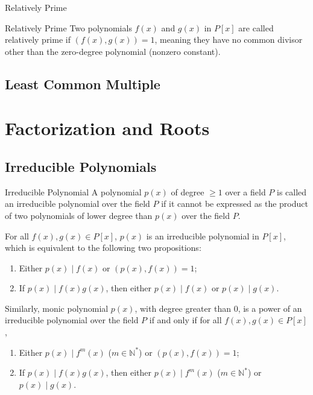 \documentclass[11pt]{elegantbook}
\begin{document}
\begin{leftbarTitle}{Relatively Prime}\end{leftbarTitle}

\begin{definition}{Relatively Prime}
    Two polynomials \( f(x) \) and \( g(x) \) in \( P[x] \) are called relatively prime 
    if \( (f(x), g(x)) = 1 \), 
    meaning they have no common divisor other than the zero-degree polynomial (nonzero constant).
\end{definition}

\section{Least Common Multiple}


\chapter{Factorization and Roots}

\section{Irreducible Polynomials}
\begin{definition}{Irreducible Polynomial}
    A polynomial \( p(x) \) of degree \( \geq 1 \) over a field \( P \) 
    is called an irreducible polynomial over the field \( P \) 
    if it cannot be expressed as the product of two polynomials of 
    lower degree than \( p(x) \) over the field \( P \).
\end{definition}

\begin{proposition}
    For all \(f(x), g(x)\in P[x]\), \(p(x)\) is an irreducible polynomial in \(P[x]\), 
    which is equivalent to the following two propositions:
    \begin{enumerate}
        \item Either \( p(x) \mid f(x) \) or \( \left(p(x), f(x)\right) = 1 \);
        \item If \( p(x) \mid f(x)g(x) \), then either \( p(x) \mid f(x) \) or \( p(x) \mid g(x) \).
    \end{enumerate}

    Similarly, monic polynomial \( p(x) \), with degree greater than \(0\), 
    is a power of an irreducible polynomial over the field \( P \)
    if and only if for all \( f(x), g(x) \in P[x] \),
    \begin{enumerate}
        \item Either \( p(x) \mid f^{m}(x) \) (\(m\in \mathbb{N}^{*}\)) or \( \left(p(x), f(x)\right) = 1 \);
        \item If \( p(x) \mid f(x)g(x) \), then either \( p(x) \mid f^{m}(x) \) (\(m\in \mathbb{N}^{*}\)) or \( p(x) \mid g(x) \).
    \end{enumerate}
\end{proposition}
\end{document}

